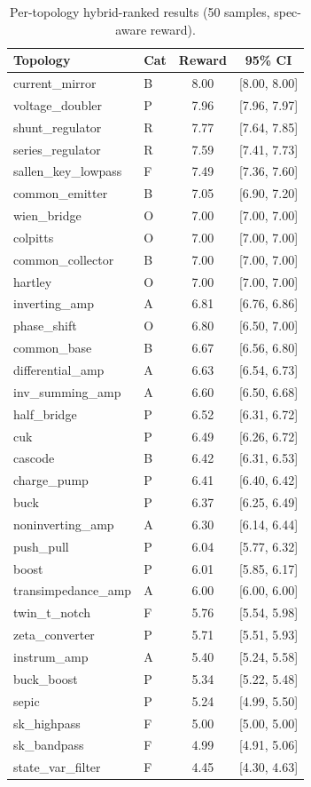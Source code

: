 \documentclass[conference]{IEEEtran}
\begin{document}
\begin{table}[h]
\centering
\caption{Per-topology hybrid-ranked results (50 samples, spec-aware reward).}
\label{tab:per_topo_full}
\small
\begin{tabular}{@{}llcc@{}}
\toprule
Topology & Cat & Reward & 95\% CI \\
\midrule
current\_mirror      & B & 8.00 & [8.00, 8.00] \\
voltage\_doubler     & P & 7.96 & [7.96, 7.97] \\
shunt\_regulator     & R & 7.77 & [7.64, 7.85] \\
series\_regulator    & R & 7.59 & [7.41, 7.73] \\
sallen\_key\_lowpass & F & 7.49 & [7.36, 7.60] \\
common\_emitter     & B & 7.05 & [6.90, 7.20] \\
wien\_bridge         & O & 7.00 & [7.00, 7.00] \\
colpitts            & O & 7.00 & [7.00, 7.00] \\
common\_collector   & B & 7.00 & [7.00, 7.00] \\
hartley             & O & 7.00 & [7.00, 7.00] \\
\midrule
inverting\_amp       & A & 6.81 & [6.76, 6.86] \\
phase\_shift         & O & 6.80 & [6.50, 7.00] \\
common\_base        & B & 6.67 & [6.56, 6.80] \\
differential\_amp   & A & 6.63 & [6.54, 6.73] \\
inv\_summing\_amp   & A & 6.60 & [6.50, 6.68] \\
half\_bridge        & P & 6.52 & [6.31, 6.72] \\
cuk                  & P & 6.49 & [6.26, 6.72] \\
cascode              & B & 6.42 & [6.31, 6.53] \\
charge\_pump         & P & 6.41 & [6.40, 6.42] \\
buck                 & P & 6.37 & [6.25, 6.49] \\
\midrule
noninverting\_amp    & A & 6.30 & [6.14, 6.44] \\
push\_pull           & P & 6.04 & [5.77, 6.32] \\
boost                & P & 6.01 & [5.85, 6.17] \\
transimpedance\_amp & A & 6.00 & [6.00, 6.00] \\
twin\_t\_notch       & F & 5.76 & [5.54, 5.98] \\
zeta\_converter     & P & 5.71 & [5.51, 5.93] \\
instrum\_amp        & A & 5.40 & [5.24, 5.58] \\
buck\_boost          & P & 5.34 & [5.22, 5.48] \\
sepic                & P & 5.24 & [4.99, 5.50] \\
sk\_highpass         & F & 5.00 & [5.00, 5.00] \\
sk\_bandpass         & F & 4.99 & [4.91, 5.06] \\
state\_var\_filter   & F & 4.45 & [4.30, 4.63] \\
\bottomrule
\end{tabular}
\end{table}
\end{document}

